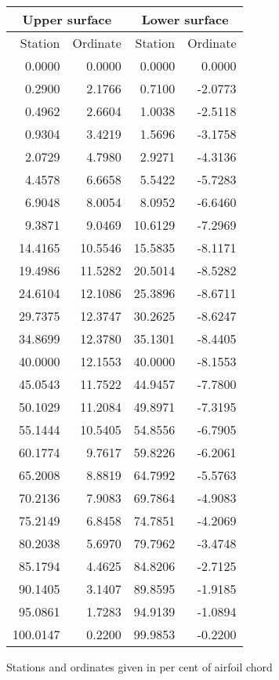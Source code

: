 \documentclass[11pt]{book}
\begin{document}
 \hspace{4mm}
 \begin{tabular}{|r|r|r|r|} \hline 
 \multicolumn{2}{|c|}{Upper surface} & \multicolumn{2}{|c|}{Lower surface} \\
 \hline
 Station & Ordinate & Station & Ordinate \\
 \hline
0.0000 & 0.0000 & 0.0000 & 0.0000 \\
0.2900 & 2.1766 & 0.7100 & -2.0773 \\
0.4962 & 2.6604 & 1.0038 & -2.5118 \\
0.9304 & 3.4219 & 1.5696 & -3.1758 \\
2.0729 & 4.7980 & 2.9271 & -4.3136 \\
4.4578 & 6.6658 & 5.5422 & -5.7283 \\
6.9048 & 8.0054 & 8.0952 & -6.6460 \\
9.3871 & 9.0469 & 10.6129 & -7.2969 \\
14.4165 & 10.5546 & 15.5835 & -8.1171 \\
19.4986 & 11.5282 & 20.5014 & -8.5282 \\
24.6104 & 12.1086 & 25.3896 & -8.6711 \\
29.7375 & 12.3747 & 30.2625 & -8.6247 \\
34.8699 & 12.3780 & 35.1301 & -8.4405 \\
40.0000 & 12.1553 & 40.0000 & -8.1553 \\
45.0543 & 11.7522 & 44.9457 & -7.7800 \\
50.1029 & 11.2084 & 49.8971 & -7.3195 \\
55.1444 & 10.5405 & 54.8556 & -6.7905 \\
60.1774 & 9.7617 & 59.8226 & -6.2061 \\
65.2008 & 8.8819 & 64.7992 & -5.5763 \\
70.2136 & 7.9083 & 69.7864 & -4.9083 \\
75.2149 & 6.8458 & 74.7851 & -4.2069 \\
80.2038 & 5.6970 & 79.7962 & -3.4748 \\
85.1794 & 4.4625 & 84.8206 & -2.7125 \\
90.1405 & 3.1407 & 89.8595 & -1.9185 \\
95.0861 & 1.7283 & 94.9139 & -1.0894 \\
100.0147 & 0.2200 & 99.9853 & -0.2200 \\
 \hline 
 \end{tabular}
 \vspace{8mm}

Stations and ordinates given in per cent of airfoil chord
\end{document}
